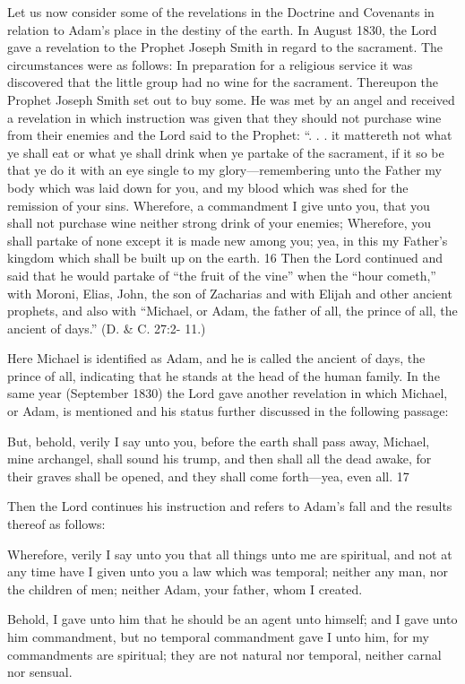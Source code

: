 Let us now consider some of the revelations in the Doctrine and Covenants in relation to
Adam's place in the destiny of the earth. In August 1830, the Lord gave a revelation to the
Prophet Joseph Smith in regard to the sacrament. The circumstances were as follows: In
preparation for a religious service it was discovered that the little group had no wine for the
sacrament. Thereupon the Prophet Joseph Smith set out to buy some. He was met by an angel
and received a revelation in which instruction was given that they should not purchase wine
from their enemies and the Lord said to the Prophet: ``. . . it mattereth not what ye shall eat or
what ye shall drink when ye partake of the sacrament, if it so be that ye do it with an eye
single to my glory—remembering unto the Father my body which was laid down for you,
and my blood which was shed for the remission of your sins. Wherefore, a commandment I
give unto you, that you shall not purchase wine neither strong drink of your enemies;
Wherefore, you shall partake of none except it is made new among you; yea, in this my
Father's kingdom which shall be built up on the earth. 16 Then the Lord continued and said
that he would partake of ``the fruit of the vine'' when the ``hour cometh,'' with Moroni, Elias,
John, the son of Zacharias and with Elijah and other ancient prophets, and also with
``Michael, or Adam, the father of all, the prince of all, the ancient of days.'' (D. \& C. 27:2-
11.)

Here Michael is identified as Adam, and he is called the ancient of days, the prince of all,
indicating that he stands at the head of the human family. In the same year (September 1830)
the Lord gave another revelation in which Michael, or Adam, is mentioned and his status
further discussed in the following passage:

But, behold, verily I say unto you, before the earth shall pass away, Michael, mine archangel,
shall sound his trump, and then shall all the dead awake, for their graves shall be opened, and
they shall come forth—yea, even all. 17

Then the Lord continues his instruction and refers to Adam's fall and the results thereof as
follows:

Wherefore, verily I say unto you that all things unto me are spiritual, and not at any time
have I given unto you a law which was temporal; neither any man, nor the children of men;
neither Adam, your father, whom I created.

Behold, I gave unto him that he should be an agent unto himself; and I gave unto him
commandment, but no temporal commandment gave I unto him, for my commandments are
spiritual; they are not natural nor temporal, neither carnal nor sensual.

